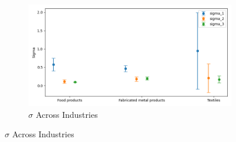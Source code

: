 \documentclass{article}
\begin{document}
\begin{figure}[ht!]
\begin{subfigure}[t]{0.32\textwidth}
    \end{subfigure}
    \begin{subfigure}[t]{0.32\textwidth}
        \centering
        \includegraphics[width=\textwidth]{figure/stationary_mixture_sigma_across_industries_m3.png}
        \caption{$\hat\sigma$ Across Industries}
    \end{subfigure}
\end{figure}
\end{document}
